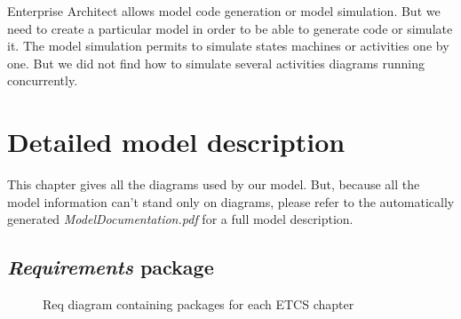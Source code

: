 \documentclass{template/openetcs_report}
\newcommand\packageName[1]{\emph{#1}}
\begin{document}
Enterprise Architect allows model code generation or model simulation. But we need to create a particular model in order to be able to generate code or simulate it. The model simulation permits to simulate states machines or activities one by one. But we did not find how to simulate several activities diagrams running concurrently.



\chapter{Detailed model description} \label{Detailed_model}

This chapter gives all the diagrams used by our model. But, because all the model information can't stand only on diagrams, please refer to the automatically generated \emph{ModelDocumentation.pdf} for a full model description.

\section{\packageName{Requirements} package}

\begin{figure}[H]
  \centering
  \caption{Req diagram containing packages for each ETCS chapter}
  \label{fig:System_Principles_Req}
\end{figure}
\end{document}
